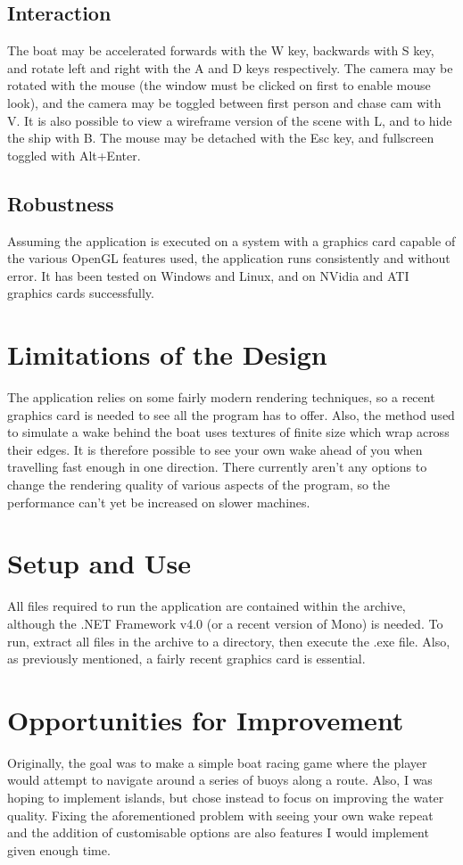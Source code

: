 \documentclass[a4paper,11pt]{article}
\begin{document}
\subsection{Interaction}
The boat may be accelerated forwards with the W key, backwards with S key, and rotate left and right with the A and D keys respectively. The camera may be rotated with the mouse (the window must be clicked on first to enable mouse look), and the camera may be toggled between first person and chase cam with V. It is also possible to view a wireframe version of the scene with L, and to hide the ship with B. The mouse may be detached with the Esc key, and fullscreen toggled with Alt+Enter.

\subsection{Robustness}
Assuming the application is executed on a system with a graphics card capable of the various OpenGL features used, the application runs consistently and without error. It has been tested on Windows and Linux, and on NVidia and ATI graphics cards successfully.

\section{Limitations of the Design}
The application relies on some fairly modern rendering techniques, so a recent graphics card is needed to see all the program has to offer. Also, the method used to simulate a wake behind the boat uses textures of finite size which wrap across their edges. It is therefore possible to see your own wake ahead of you when travelling fast enough in one direction. There currently aren't any options to change the rendering quality of various aspects of the program, so the performance can't yet be increased on slower machines.

\section{Setup and Use}
All files required to run the application are contained within the archive, although the .NET Framework v4.0 (or a recent version of Mono) is needed. To run, extract all files in the archive to a directory, then execute the .exe file. Also, as previously mentioned, a fairly recent graphics card is essential.

\section{Opportunities for Improvement}
Originally, the goal was to make a simple boat racing game where the player would attempt to navigate around a series of buoys along a route. Also, I was hoping to implement islands, but chose instead to focus on improving the water quality. Fixing the aforementioned problem with seeing your own wake repeat and the addition of customisable options are also features I would implement given enough time.
\end{document}
